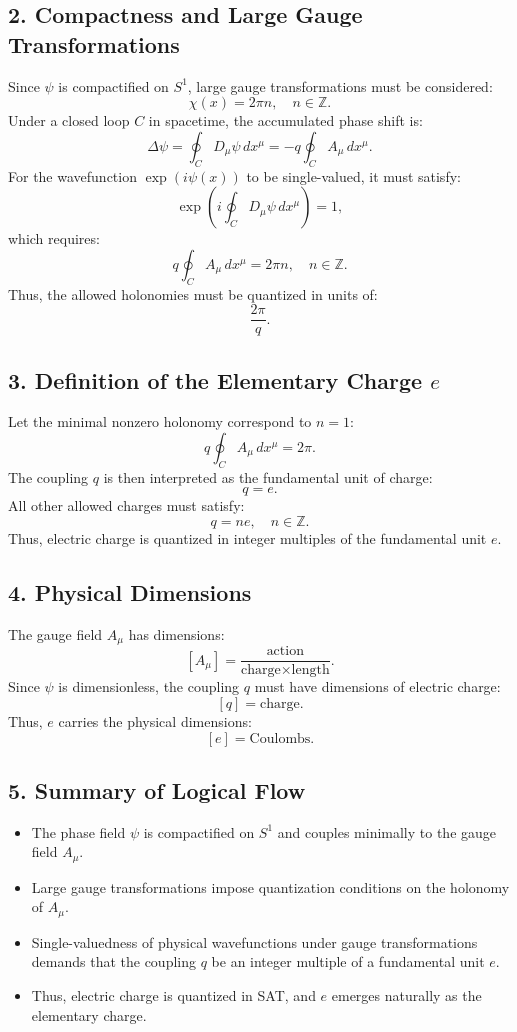 \documentclass[12pt]{article}
\begin{document}
\subsection*{2. Compactness and Large Gauge Transformations}
Since \(\psi\) is compactified on \(S^1\), large gauge transformations must be considered:
\[
\chi(x) = 2\pi n, \quad n \in \mathbb{Z}.
\]
Under a closed loop \(C\) in spacetime, the accumulated phase shift is:
\[
\Delta \psi = \oint_C D_\mu \psi \, dx^\mu = - q \oint_C A_\mu \, dx^\mu.
\]
For the wavefunction \(\exp(i \psi(x))\) to be single-valued, it must satisfy:
\[
\exp\left( i \oint_C D_\mu \psi \, dx^\mu \right) = 1,
\]
which requires:
\[
q \oint_C A_\mu \, dx^\mu = 2\pi n, \quad n \in \mathbb{Z}.
\]
Thus, the allowed holonomies must be quantized in units of:
\[
\frac{2\pi}{q}.
\]

\subsection*{3. Definition of the Elementary Charge \(e\)}
Let the minimal nonzero holonomy correspond to \(n = 1\):
\[
q \oint_C A_\mu \, dx^\mu = 2\pi.
\]
The coupling \(q\) is then interpreted as the fundamental unit of charge:
\[
q = e.
\]
All other allowed charges must satisfy:
\[
q = n e, \quad n \in \mathbb{Z}.
\]
Thus, electric charge is quantized in integer multiples of the fundamental unit \(e\).

\subsection*{4. Physical Dimensions}
The gauge field \(A_\mu\) has dimensions:
\[
[A_\mu] = \frac{\text{action}}{\text{charge} \times \text{length}}.
\]
Since \(\psi\) is dimensionless, the coupling \(q\) must have dimensions of electric charge:
\[
[q] = \text{charge}.
\]
Thus, \(e\) carries the physical dimensions:
\[
[e] = \text{Coulombs}.
\]

\subsection*{5. Summary of Logical Flow}
\begin{itemize}
    \item The phase field \(\psi\) is compactified on \(S^1\) and couples minimally to the gauge field \(A_\mu\).
    \item Large gauge transformations impose quantization conditions on the holonomy of \(A_\mu\).
    \item Single-valuedness of physical wavefunctions under gauge transformations demands that the coupling \(q\) be an integer multiple of a fundamental unit \(e\).
    \item Thus, electric charge is quantized in SAT, and \(e\) emerges naturally as the elementary charge.
\end{itemize}
\end{document}
